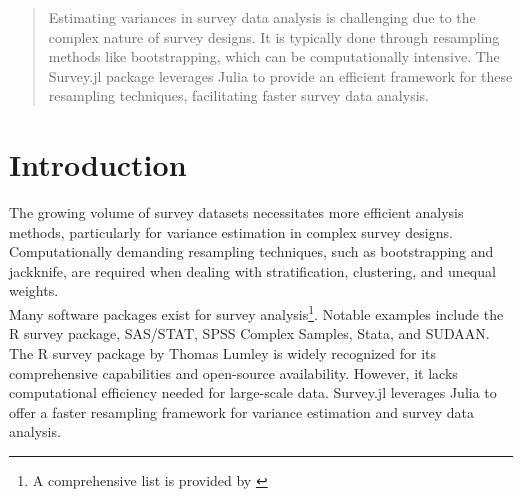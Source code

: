 \documentclass{juliacon}
\begin{document}


\maketitle

\begin{abstract}

Estimating variances in survey data analysis is challenging due to the complex nature of survey designs. It is typically done through resampling methods like bootstrapping, which can be computationally intensive. The Survey.jl package leverages Julia to provide an efficient framework for these resampling techniques, facilitating faster survey data analysis.

\end{abstract}

\section{Introduction}

The growing volume of survey datasets necessitates more efficient analysis methods, particularly for variance estimation in complex survey designs. Computationally demanding resampling techniques, such as bootstrapping and jackknife, are required when dealing with stratification, clustering, and unequal weights. 
\\

Many software packages exist for survey analysis\footnote{A comprehensive list is provided by \cite{SummarySurveyAnalysis}}. Notable examples include the R survey package, SAS/STAT, SPSS Complex Samples, Stata, and SUDAAN. The R survey package by Thomas Lumley\cite{lumley2004analysis} is widely recognized for its comprehensive capabilities and open-source availability. However, it lacks computational efficiency needed for large-scale data. Survey.jl leverages Julia to offer a faster resampling framework for variance estimation and survey data analysis.




\end{document}
